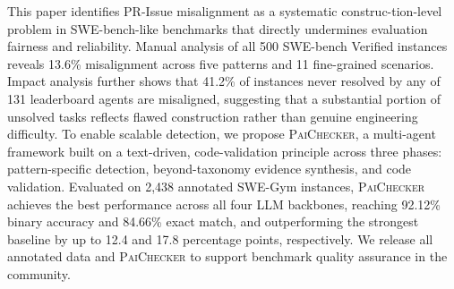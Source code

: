 \documentclass[sigconf, review, anonymous]{acmart}
\newcommand{\tool}{\textsc{PaiChecker}\xspace}
\begin{document}
This paper identifies PR-Issue misalignment as a systematic
   construc-\allowbreak tion-level problem in SWE-bench-like benchmarks that
   directly undermines evaluation fairness and reliability.    
  Manual analysis of all 500 SWE-bench Verified instances      
  reveals 13.6\% misalignment across five patterns and 11       
  fine-grained scenarios. Impact analysis further shows that   
  41.2\% of instances never resolved by any of 131 leaderboard  
  agents are misaligned, suggesting that a substantial portion
  of unsolved tasks reflects flawed construction rather than
  genuine engineering difficulty.
  To enable scalable detection, we propose \tool, a          
  multi-agent framework built on a text-driven, code-validation
   principle across three phases: pattern-specific detection,  
  beyond-taxonomy evidence synthesis, and code validation. Evaluated on 2,438 annotated SWE-Gym 
  instances, \tool achieves the best performance across all
  four LLM backbones, reaching 92.12\% binary accuracy and
  84.66\% exact match, and outperforming the strongest baseline
  by up to 12.4 and 17.8 percentage points, respectively. We
  release all annotated data and \tool to support benchmark
  quality assurance in the community.

    
    
\end{document}
